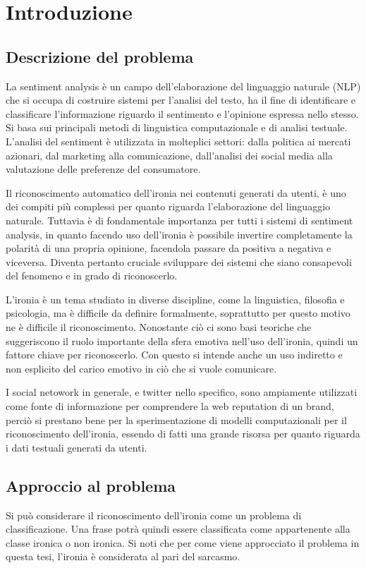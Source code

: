 \documentclass[oneside]{book}
\begin{document}
\tableofcontents


\chapter{Introduzione}

\section{Descrizione del problema}

La sentiment analysis è un campo dell'elaborazione del linguaggio naturale (NLP) che si occupa di costruire sistemi per l'analisi del testo, ha il fine di identificare e classificare l'informazione riguardo il sentimento e l'opinione espressa nello stesso. Si basa sui principali metodi di linguistica computazionale e di analisi testuale. L'analisi del sentiment è utilizzata in molteplici settori: dalla politica ai mercati azionari, dal marketing alla comunicazione, dall'analisi dei social media alla valutazione delle preferenze del consumatore. 

Il riconoscimento automatico dell'ironia nei contenuti generati da utenti, è uno dei compiti più complessi per quanto riguarda l'elaborazione del linguaggio naturale. Tuttavia è di fondamentale importanza per tutti i sistemi di sentiment analysis, in quanto facendo uso dell'ironia è possibile invertire completamente la polarità di una propria opinione, facendola passare da positiva a negativa e viceversa.
Diventa pertanto cruciale sviluppare dei sistemi che siano consapevoli del fenomeno e in grado di riconoscerlo.

L'ironia è un tema studiato in diverse discipline, come la linguistica, filosofia e psicologia, ma è difficile da definire formalmente, soprattutto per questo motivo ne è difficile il riconoscimento. Nonostante ciò ci sono basi teoriche che suggeriscono il ruolo importante della sfera emotiva nell'uso dell'ironia, quindi un fattore chiave per riconoscerlo. Con questo si intende anche un uso indiretto e non esplicito del carico emotivo in ciò che si vuole comunicare.

I social netowork in generale, e twitter nello specifico, sono ampiamente utilizzati come fonte di informazione per comprendere la web reputation di un brand, perciò si prestano bene per la sperimentazione di modelli computazionali per il riconoscimento dell'ironia, essendo di fatti una grande risorsa per quanto riguarda i dati testuali generati da utenti.


\section{Approccio al problema}
Si può considerare il riconoscimento dell'ironia come un problema di classificazione. Una frase potrà quindi essere classificata come appartenente alla classe ironica o non ironica. Si noti che per come viene approcciato il problema in questa tesi, l'ironia è considerata al pari del sarcasmo.
\end{document}
